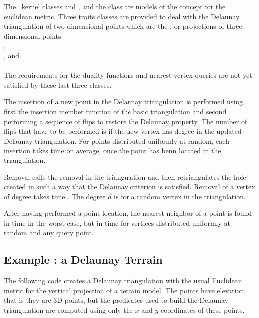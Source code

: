 The \cgal\  kernel classes  and
, and the class 
are models of the concept 
for the euclidean metric.
Three traits classes are provided to deal with
the Delaunay triangulation of two dimensional points which are
the ,  or  projections of three dimensional points:\\
,\\
, and\\
 \\
The requirements for the duality functions and nearest vertex
queries are not yet satisfied by
these last three classes.

The insertion of a new point in the Delaunay triangulation
is performed using first the insertion member function
of the basic triangulation and second 
performing a sequence of flips to restore the Delaunay property. 
The number of flips that have to be performed is 
if the new vertex has degree  in the updated
Delaunay triangulation. For
points distributed uniformly at random, 
each insertion takes time  on
average, once the point has benn located in the triangulation.

Removal calls the removal in the triangulation and then retriangulates
the hole created in such a way that  the Delaunay criterion is
satisfied. Removal of a
vertex of degree  takes time .
The degree $d$ is  for a random
vertex in the triangulation.

After having performed a  point location, the
nearest neighbor of a point is found in time  in the
worst case, but in time 
for vertices distributed uniformly at random  and any query point. 


\subsection{Example : a Delaunay Terrain}
\label{Subsection_2D_Triangulations_Delaunay_Terrain}

The following code  creates a Delaunay triangulation with 
the usual Euclidean metric for the vertical projection of a 
terrain model. The points have elevation, that is they are 3D points,
but the predicates used to build the  Delaunay triangulation
are computed using only  the $x$ and $y$ coordinates  
of these points. 

